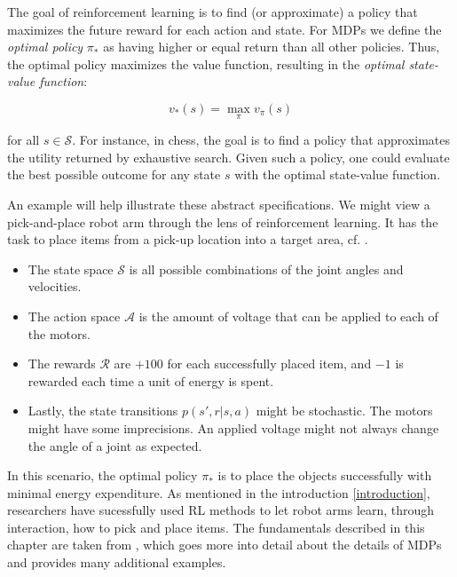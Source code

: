 The goal of reinforcement learning is to find (or approximate) a policy that maximizes the future reward for each action and state. For MDPs we define the \textit{optimal policy} $\pi_*$ as having higher or equal return than all other policies. Thus, the optimal policy maximizes the value function, resulting in the \textit{optimal state-value function}:

\begin{equation}
    v_{*}(s) = \max_{\pi} v_{\pi}(s)
\end{equation}

for all $s \in \mathcal{S}$. For instance, in chess, the goal is to find a policy that approximates the utility returned by exhaustive search. Given such a policy, one could evaluate the best possible outcome for any state $s$ with the optimal state-value function.

An example will help illustrate these abstract specifications. We might view a pick-and-place robot arm through the lens of reinforcement learning. It has the task to place items from a pick-up location into a target area, cf. \cite{noauthor_examples_nodate}.

\begin{itemize}
    \item The state space $ \mathcal{S} $ is all possible combinations of the joint angles and velocities.
    \item The action space $ \mathcal{A} $ is the amount of voltage that can be applied to each of the motors.
    \item The rewards $ \mathcal{R} $ are $+100$ for each successfully placed item, and $-1$ is rewarded each time a unit of energy is spent.
    \item Lastly, the state transitions $p(s', r | s, a)$ might be stochastic. The motors might have some imprecisions. An applied voltage might not always change the angle of a joint as expected.
\end{itemize}

In this scenario, the optimal policy $ \pi_* $ is to place the objects successfully with minimal energy expenditure. As mentioned in the introduction \ref{introduction}, researchers have sucessfully used RL methods to let robot arms learn, through interaction, how to pick and place items. The fundamentals described in this chapter are taken from \cite[p. 47ff.]{sutton_reinforcement_2018}, which goes more into detail about the details of MDPs and provides many additional examples.

